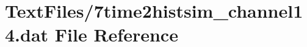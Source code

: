 \hypertarget{7time2histsim__channel14_8dat}{}\section{Text\+Files/7time2histsim\+\_\+channel14.dat File Reference}
\label{7time2histsim__channel14_8dat}
